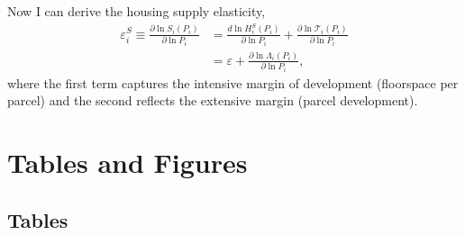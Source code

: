 \documentclass[
  12pt,
]{article}
\begin{document}
Now I can derive the housing supply elasticity, \begin{equation}
\begin{aligned}
\varepsilon^S_{i} \equiv \frac{\partial \ln S_{i}\left(P_{i}\right)}{\partial \ln P_{i}}&=\frac{d \ln H^S_{i}\left(P_{i}\right)}{\partial \ln P_{i}}+ \frac{\partial \ln \mathcal{T}_{i}\left(P_{i}\right)}{\partial \ln P_{i}} \\
&= \varepsilon + \frac{\partial \ln\Lambda_i(P_i)}{\partial \ln P_i},
\end{aligned}
\label{eq:app-elasticity}
\end{equation} where the first term captures the intensive margin of development (floorspace per parcel) and the second reflects the extensive margin (parcel development).

\section{Tables and Figures}\label{tables-and-figures}

\subsection{Tables}\label{tables}
\end{document}
